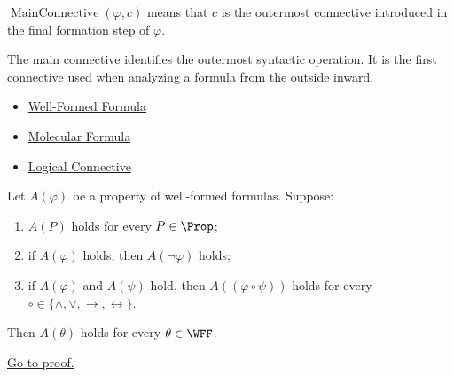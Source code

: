\begin{remark*}
\(\operatorname{MainConnective}(\varphi,c)\) means that \(c\) is the outermost connective introduced in the final formation step of \(\varphi\).
\end{remark*}

\begin{remark*}[Interpretation]
The main connective identifies the outermost syntactic operation. It is the first connective used when analyzing a formula from the outside inward.
\end{remark*}

\begin{dependencies}
\begin{itemize}
  \item \hyperref[def:well-formed-formula]{Well-Formed Formula}
  \item \hyperref[def:molecular-formula-propositional-logic]{Molecular Formula}
  \item \hyperref[def:logical-connective]{Logical Connective}
\end{itemize}
\end{dependencies}
\begin{tcolorbox}[colback=thmbox, colframe=thmborder, arc=2pt,
  left=6pt, right=6pt, top=4pt, bottom=4pt,
  title={\small\textbf{Theorem (Structural Induction for Propositional Formulas)}},
  fonttitle=\small\bfseries]
\begin{theorem}
\label{thm:structural-induction-propositional-formulas}
Let \(A(\varphi)\) be a property of well-formed formulas. Suppose:
\begin{enumerate}
\item \(A(P)\) holds for every \(P\in\Prop\);
\item if \(A(\varphi)\) holds, then \(A(\neg\varphi)\) holds;
\item if \(A(\varphi)\) and \(A(\psi)\) hold, then \(A((\varphi\circ\psi))\) holds for every \(\circ\in\{\land,\lor,\to,\leftrightarrow\}\).
\end{enumerate}
Then \(A(\theta)\) holds for every \(\theta\in\WFF\).

\noindent\hyperref[prf:structural-induction-propositional-formulas]{Go to proof.}
\end{theorem}
\end{tcolorbox}

